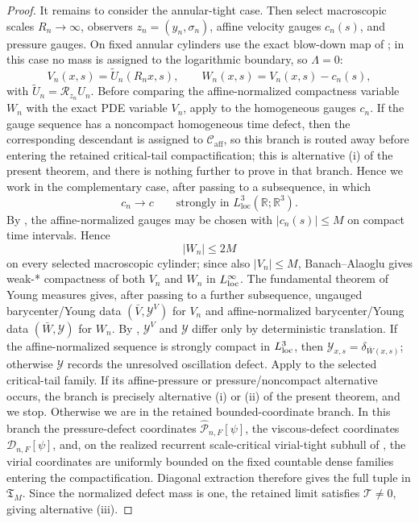 \documentclass[11pt]{amsart}
\numberwithin{equation}{section}
\theoremstyle{plain}
\theoremstyle{definition}
\theoremstyle{remark}
\newcommand{\loc}{\mathrm{loc}}
\newcommand{\calR}{\mathcal R}
\newcommand{\Caff}{\mathcal C_{\mathrm{aff}}}
\newcommand{\Tcrit}{\mathfrak T_M}
\begin{document}
\begin{proof}
It remains to consider the annular-tight case.  Then select macroscopic scales
\(R_n\to\infty\), observers \(z_n=(y_n,\sigma_n)\), affine velocity gauges
\(c_n(s)\), and pressure gauges.  On fixed annular cylinders use the exact
blow-down map of ; in this case no
mass is assigned to the logarithmic boundary, so \(\Lambda=0\):
\[
   V_n(x,s)=\widetilde U_n(R_nx,s),\qquad
   W_n(x,s)=V_n(x,s)-c_n(s),
\]
with \(\widetilde U_n=\calR_{z_n}U_n\).
Before comparing the affine-normalized compactness variable \(W_n\) with the
exact PDE variable \(V_n\), apply
 to the homogeneous gauges
\(c_n\).  If the gauge sequence has a noncompact homogeneous time defect, then
the corresponding descendant is assigned to \(\Caff\), so this branch is routed
away before entering the retained critical-tail compactification; this is
alternative \textup{(i)} of the present theorem, and there is nothing further to
prove in that branch.  Hence we work in the complementary case, after passing to
a subsequence, in which
\[
   c_n\to c
   \qquad\text{strongly in }L^3_{\loc}(\mathbb R;\mathbb R^3).
\]
By , the affine-normalized gauges
may be chosen with \(|c_n(s)|\le M\) on compact time intervals.  Hence
\[
   |W_n|\le 2M
\]
on every selected macroscopic cylinder; since also \(|V_n|\le M\),
Banach--Alaoglu gives weak-* compactness of both \(V_n\) and \(W_n\) in
\(L^\infty_{\rm loc}\).  The fundamental theorem of Young measures gives, after
passing to a further subsequence, ungauged barycenter/Young data
\((\bar V,\mathcal Y^V)\) for \(V_n\) and affine-normalized barycenter/Young
data \((\bar W,\mathcal Y)\) for \(W_n\).  By
,
\(\mathcal Y^V\) and \(\mathcal Y\) differ only by deterministic translation.
If the affine-normalized sequence is strongly compact in \(L^3_{\rm loc}\), then
\(\mathcal Y_{x,s}=\delta_{\bar W(x,s)}\); otherwise \(\mathcal Y\) records the
unresolved oscillation defect.
Apply  to the selected
critical-tail family.  If its affine-pressure or pressure/noncompact alternative
occurs, the branch is precisely alternative \textup{(i)} or \textup{(ii)} of the
present theorem, and we stop.  Otherwise we are in the retained
bounded-coordinate branch.  In this branch the pressure-defect
coordinates \(\widehat{\mathscr P}_{n,F}[\psi]\), the viscous-defect coordinates
\(\mathscr D_{n,F}[\psi]\), and, on the realized recurrent scale-critical
virial-tight subhull of , the
virial coordinates are uniformly bounded on the fixed countable dense families
entering the compactification.  Diagonal extraction therefore gives the full
tuple in \(\Tcrit\).  Since the normalized defect mass is one, the retained
limit satisfies \(\mathcal T\ne0\), giving alternative \textup{(iii)}.


\end{proof}
\end{document}
